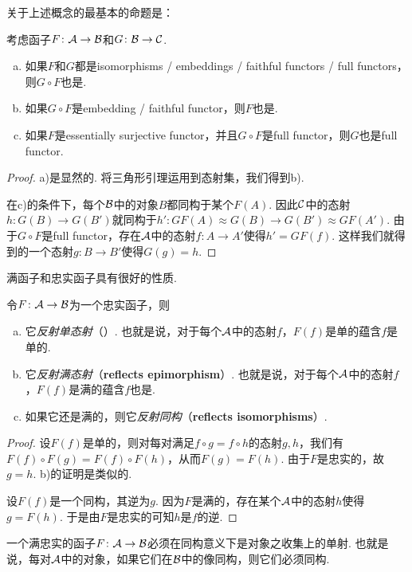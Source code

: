   关于上述概念的最基本的命题是：
  \begin{prop}\label{prop:tri-(full,faithful)}
    考虑函子$F\colon{\cal A}\to{\cal B}$和$G\colon{\cal B}\to{\cal C}$.
    \begin{enumerate}[a)]
      \item 如果$F$和$G$都是isomorphisms / embeddings / faithful functors / full functors，则$G\circ F$也是.
      \item 如果$G\circ F$是embedding / faithful functor，则$F$也是.
      \item 如果$F$是essentially surjective functor，并且$G\circ F$是full functor，则$G$也是full functor.
    \end{enumerate}
  \end{prop}
  \begin{proof}
    a)是显然的. 将三角形引理运用到态射集，我们得到b).

    在c)的条件下，每个${\cal B}$中的对象$B$都同构于某个$F(A)$. 因此${\cal C}$中的态射$h\colon G(B)\to G(B')$就同构于$h'\colon GF(A)\approx G(B)\to G(B')\approx GF(A')$. 由于$G\circ F$是full functor，存在${\cal A}$中的态射$f\colon A\to A'$使得$h'=GF(f)$.
    这样我们就得到的一个态射$g\colon B\to B'$使得$G(g)=h$.
  \end{proof}

  满函子和忠实函子具有很好的性质.
  \begin{prop}
    令$F\colon{\cal A}\to{\cal B}$为一个忠实函子，则
    \begin{enumerate}[a)]
      \item 它\emph{反射单态射}（）. 也就是说，对于每个${\cal A}$中的态射$f$，$F(f)$是单的蕴含$f$是单的.
      \item 它\emph{反射满态射}（\textbf{reflects epimorphism}）. 也就是说，对于每个${\cal A}$中的态射$f$，$F(f)$是满的蕴含$f$也是.
      \item 如果它还是满的，则它\emph{反射同构}（\textbf{reflects isomorphisms}）.
    \end{enumerate}
  \end{prop}
  \begin{proof}
    设$F(f)$是单的，则对每对满足$f\circ g=f\circ h$的态射$g,h$，我们有$F(f)\circ F(g) = F(f)\circ F(h)$，从而$F(g)=F(h)$. 由于$F$是忠实的，故$g=h$. b)的证明是类似的.

    设$F(f)$是一个同构，其逆为$g$. 因为$F$是满的，存在某个${\cal A}$中的态射$h$使得$g=F(h)$. 于是由$F$是忠实的可知$h$是$f$的逆.
  \end{proof}

  \begin{cor}
    一个满忠实的函子$F\colon{\cal A}\to{\cal B}$必须在同构意义下是对象之收集上的单射. 也就是说，每对${\cal A}$中的对象，如果它们在${\cal B}$中的像同构，则它们必须同构.
  \end{cor}

